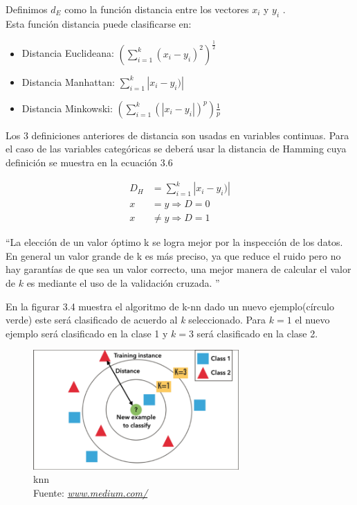 Definimos $d_{E}$ como la función distancia entre los vectores  $x_{i}$ y $y_{i}$ .\\ Esta función distancia puede clasificarse en:

  \begin{itemize}

  \item Distancia Euclideana:    $(\sum_{i=1}^{k}(x_{i} - y_{i})^2)^\frac{1}{2}$
  \item Distancia Manhattan:     $\sum_{i=1}^{k}|x_{i} - y_{i})|  $
  \item Distancia Minkowski:     $(\sum_{i=1}^{k}(|x_{i} - y_{i}|)^p)\frac{1}{p}$
  \end{itemize}
Los 3 definiciones anteriores de distancia son usadas en variables continuas.  Para el caso de las variables categóricas se deberá usar la distancia de Hamming cuya definición se muestra en la ecuación 3.6


  \begin{equation}
  \label{eq:t6}
  \begin{aligned}
  	D_{H}&=\sum_{i=1}^{k}|x_{i} - y_{i})|\\
  	x&=y \Longrightarrow D=0\\
  	x&\neq y \Longrightarrow D=1
  \end{aligned}
  \end{equation}
  	
\textquotedblleft La elección de un valor óptimo k se logra mejor por la inspección de los datos. En general un valor grande de k es más preciso, ya que reduce el ruido pero no hay garantías de que sea un valor correcto, una mejor manera de calcular el valor de $k$ es mediante el uso de la validación cruzada.
\textquotedblright \cite{WEBSITE:7}

En la figurar 3.4 muestra el algoritmo de k-nn dado un nuevo ejemplo(círculo verde) este será clasificado de acuerdo al \textit{k} seleccionado. Para $k=1$ el nuevo ejemplo será clasificado en la clase 1 y $k=3$ será clasificado en la clase 2.
 \begin{figure}[H]
 	\centering
 	\includegraphics[width=0.7\textwidth]{Figures/knn.png}
 	\caption{knn \\ Fuente:  \href{https://medium.com/@adi.bronshtein/a-quick-introduction-to-k-nearest-neighbors-algorithm-62214cea29c7}{\textit{www.medium.com/}}}
 	\label{knn}
 \end{figure} 
